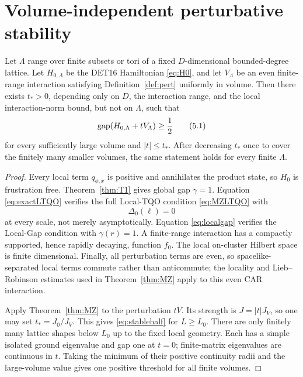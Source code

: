 \section{Volume-independent perturbative stability}

\begin{theorem}
\label{thm:T3}
Let $\Lambda$ range over finite subsets or tori of a fixed
$D$-dimensional bounded-degree lattice.  Let $H_{0,\Lambda}$ be the
DET16 Hamiltonian \eqref{eq:H0}, and let $V_\Lambda$ be an even
finite-range interaction satisfying Definition~\ref{def:pert}
uniformly in volume.  Then there exists $t_*>0$, depending only on
$D$, the interaction range, and the local interaction-norm bound, but
not on $\Lambda$, such that
\[
 \operatorname{gap}(H_{0,\Lambda}+tV_\Lambda)\geq\frac12
\tag{5.1}\label{eq:stablehalf}
\]
for every sufficiently large volume and $|t|\leq t_*$.  After
decreasing $t_*$ once to cover the finitely many smaller volumes, the
same statement holds for every finite $\Lambda$.
\end{theorem}

\begin{proof}
Every local term $q_{\phi,x}$ is positive and annihilates the product
state, so $H_0$ is frustration free.  Theorem~\ref{thm:T1} gives
global gap $\gamma=1$.  Equation \eqref{eq:exactLTQO} verifies the full
Local-TQO condition \eqref{eq:MZLTQO} with
\[
 \Delta_0(\ell)=0
\]
at every scale, not merely asymptotically.  Equation
\eqref{eq:localgap} verifies the Local-Gap condition with
$\gamma(r)=1$.  A finite-range interaction has a compactly supported,
hence rapidly decaying, function $f_0$.  The local on-cluster Hilbert
space is finite dimensional.  Finally, all perturbation terms are
even, so spacelike-separated local terms commute rather than
anticommute; the locality and Lieb--Robinson estimates used in
Theorem~\ref{thm:MZ} apply to this even CAR interaction.

Apply Theorem~\ref{thm:MZ} to the perturbation $tV$.  Its strength is
$J=|t|J_V$, so one may set $t_*=J_0/J_V$.  This gives
\eqref{eq:stablehalf} for $L\geq L_0$.  There are only finitely many
lattice shapes below $L_0$ up to the fixed local geometry.  Each has a
simple isolated ground eigenvalue and gap one at $t=0$; finite-matrix
eigenvalues are continuous in $t$.  Taking the minimum of their
positive continuity radii and the large-volume value gives one
positive threshold for all finite volumes.
\end{proof}

